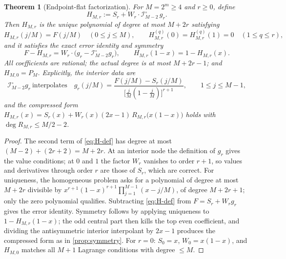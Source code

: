 \documentclass[11pt,oneside]{article}
\numberwithin{equation}{section}
\newtheorem{theorem}{Theorem}[section]
\theoremstyle{definition}
\theoremstyle{remark}
\newcommand{\Lag}{\mathcal I}
\begin{document}
\begin{theorem}[Endpoint-flat factorization]
\label{thm:factorization}
For $M=2^{m}\ge4$ and $r\ge0$, define
\begin{equation}
 H_{M,r}:=S_r+W_r\cdot\Lag^{\circ}_{M-2}\,g_r.
 \label{eq:H-def}
\end{equation}
Then $H_{M,r}$ is the unique polynomial of degree at most $M+2r$
satisfying
\begin{equation}
 H_{M,r}(j/M)=F(j/M)\quad(0\le j\le M),
 \qquad
 H^{(q)}_{M,r}(0)=H^{(q)}_{M,r}(1)=0\quad(1\le q\le r),
 \label{eq:H-conditions}
\end{equation}
and it satisfies the exact error identity and symmetry
\begin{equation}
 F-H_{M,r}=W_r\cdot\bigl(g_r-\Lag^{\circ}_{M-2}g_r\bigr),
 \qquad
 H_{M,r}(1-x)=1-H_{M,r}(x).
 \label{eq:H-error-factor}
\end{equation}
All coefficients are rational; the actual degree is at most
$M+2r-1$; and $H_{M,0}=P_M$.  Explicitly, the interior data are
\begin{equation}
 \Lag^{\circ}_{M-2}g_r\ \text{interpolates}\quad
 g_r(j/M)=\frac{F(j/M)-S_r(j/M)}
 {\bigl[\tfrac jM(1-\tfrac jM)\bigr]^{r+1}},
 \qquad 1\le j\le M-1,
 \label{eq:quotient-data}
\end{equation}
and the compressed form
$H_{M,r}(x)=S_r(x)+W_r(x)(2x-1)\,
R_{M,r}\bigl(x(1-x)\bigr)$ holds with $\deg R_{M,r}\le M/2-2$.
\end{theorem}

\begin{proof}
The second term of \eqref{eq:H-def} has degree at most
$(M-2)+(2r+2)=M+2r$.  At an interior node the definition of
$g_r$ gives the value conditions; at $0$ and $1$ the factor $W_r$
vanishes to order $r+1$, so values and derivatives through order $r$
are those of $S_r$, which are correct.  For uniqueness, the
homogeneous problem asks for a polynomial of degree at most
$M+2r$ divisible by
$x^{r+1}(1-x)^{r+1}\prod_{j=1}^{M-1}(x-j/M)$, of degree
$M+2r+1$; only the zero polynomial qualifies.  Subtracting
\eqref{eq:H-def} from $F=S_r+W_rg_r$ gives the error identity.
Symmetry follows by applying uniqueness to $1-H_{M,r}(1-x)$; the odd
central part then kills the top even coefficient, and dividing the
antisymmetric interior interpolant by $2x-1$ produces the compressed
form as in \cref{prop:symmetry}.  For $r=0$: $S_0=x$,
$W_0=x(1-x)$, and $H_{M,0}$ matches all $M+1$ Lagrange conditions
with degree $\le M$.
\end{proof}
\end{document}
